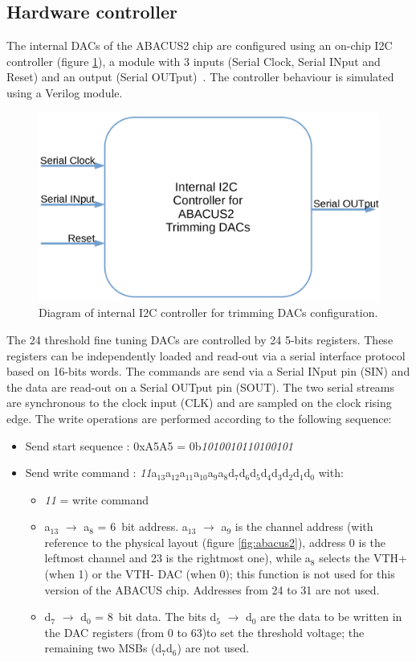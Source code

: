 \subsection{Hardware controller}\label{InternalDac}
\noindent The internal DACs of the ABACUS2 chip are configured using an on-chip I2C controller (figure \ref{fig:internaldac}), a module with 3 inputs (Serial Clock, Serial INput and Reset) and an output (Serial OUTput)~\cite{dac}.
The controller behaviour is simulated using a Verilog module.
\begin{figure}[H]
	\centering
	\includegraphics[width=0.34\linewidth]{IMG/ch4/INTERNALDAC.PNG}
	\caption{Diagram of internal I2C controller for trimming DACs configuration.}
	\label{fig:internaldac}
\end{figure}
\noindent The 24 threshold fine tuning DACs are controlled by 24 5-bits registers. These registers can be independently
loaded and read-out via a serial interface protocol based on 16-bits words. The commands are send via a Serial
INput pin (SIN) and the data are read-out on a Serial OUTput pin (SOUT). The two serial streams are
synchronous to the clock input (CLK) and are sampled on the clock rising edge.
The write operations are performed according to the following sequence:
\begin{itemize}
	\item Send start sequence : 0xA5A5 = 0b\textit{1010010110100101}
	\item Send write command : \textit{11}a$_{13}$a$_{12}$a$_{11}$a$_{10}$a$_{9}$a$_{8}$d$_{7}$d$_{6}$d$_{5}$d$_{4}$d$_{3}$d$_{2}$d$_{1}$d$_{0}$ with:
	\begin{itemize}
		\item \textit{11} = write command
		\item a$_{13}$ $\rightarrow$ a$_{8}$ = 6~bit address. a$_{13}$ $\rightarrow$ a$_{9}$ is the channel address (with reference to the physical layout (figure \ref{fig:abacus2}), address 0 is the leftmost channel and 23 is the rightmost one), while a$_{8}$ selects the VTH+ (when 1) or the VTH- DAC (when 0); this function is not used for this version of the ABACUS chip. Addresses from 24 to 31 are not used.
		\item d$_{7}$ $\rightarrow$ d$_{0}$ = 8~bit data. The bits d$_{5}$ $\rightarrow$ d$_{0}$ are the data to be written in the DAC registers (from 0 to 63)to set the threshold voltage; the remaining two MSBs (d$_{7}$d$_{6}$) are not used.
	\end{itemize}
\end{itemize}
